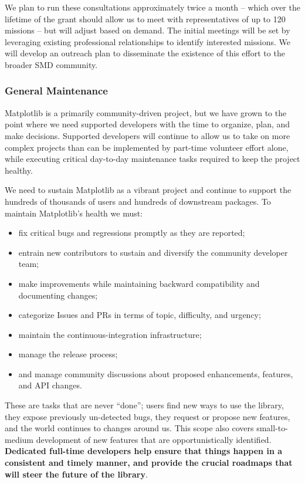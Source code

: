 \documentclass[12pt]{article}
\numberwithin{page}{section}
\begin{document}
We plan to run these consultations approximately twice a month -- which over
the lifetime of the grant should allow us to meet with representatives of up to
120 missions -- but will adjust based on demand.  The initial meetings will be
set by leveraging existing professional relationships to identify interested
missions.  We will develop an outreach plan to disseminate the existence of
this effort to the broader SMD community.



\subsubsection{General Maintenance}

Matplotlib is a primarily community-driven project, but we have grown to the
point where we need supported developers with the time to organize, plan, and
make decisions.  Supported developers will continue to allow us to take on more
complex projects than can be implemented by part-time volunteer effort alone,
while executing critical day-to-day maintenance tasks required to keep the
project healthy.


We need to sustain Matplotlib as a vibrant project and continue to support the
hundreds of thousands of users and hundreds of downstream packages.  To maintain
Matplotlib's health we must:
\begin{itemize}[noitemsep]
\item fix critical bugs and regressions promptly as they are reported;
\item entrain new contributors to sustain and diversify the community
  developer team;
\item make improvements while maintaining backward compatibility and
  documenting changes;
\item categorize Issues and PRs in terms of topic, difficulty, and
  urgency;
\item maintain the continuous-integration infrastructure;
\item manage the release process;
\item and manage community discussions about proposed enhancements, features,
  and API changes.
\end{itemize}
These are tasks that are never ``done''; users find new ways to use the
library, they expose previously un-detected bugs, they request or propose new
features, and the world continues to changes around us.  This scope also covers
small-to-medium development of new features that are opportunistically
identified.  \textbf{Dedicated full-time developers help ensure that things
  happen in a consistent and timely manner, and provide the crucial roadmaps
  that will steer the future of the library}.
\end{document}
